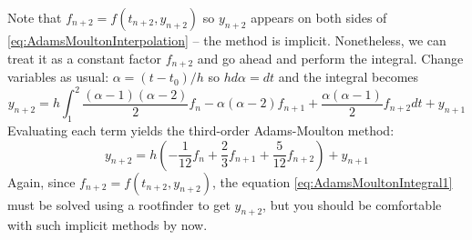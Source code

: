 \documentclass[hidelinks,notitlepage]{book}
\begin{document}
Note that $f_{n+2} = f(t_{n+2}, y_{n+2})$ so $y_{n+2}$ appears on both sides of \cref{eq:AdamsMoultonInterpolation} -- the method is implicit.  Nonetheless, we can treat it as a constant factor $f_{n+2}$ and go ahead and perform the integral.  Change variables as usual: $\alpha = (t-t_0)/h$ so $h d\alpha = dt$ and the integral becomes
\begin{equation}
\label{eq:AdamsMoultonIntegral}
y_{n+2} = h \int_1^2 
\frac{(\alpha-1)(\alpha-2)}{2} f_{n}
-\alpha(\alpha-2) f_{n+1}
+\frac{\alpha(\alpha-1)}{2} f_{n+2}
dt 
+ y_{n+1}
\end{equation}
Evaluating each term yields the third-order Adams-Moulton method:
\begin{equation}
\label{eq:AdamsMoultonIntegral1}
y_{n+2} = h \left( -\frac{1}{12} f_n + \frac{2}{3} f_{n+1} + \frac{5}{12} f_{n+2} \right)
+ y_{n+1}
\end{equation}
Again, since $f_{n+2} = f(t_{n+2}, y_{n+2})$, the equation \cref{eq:AdamsMoultonIntegral1} must be solved using a rootfinder to get $y_{n+2}$, but you should be comfortable with such implicit methods by now.
\end{document}
